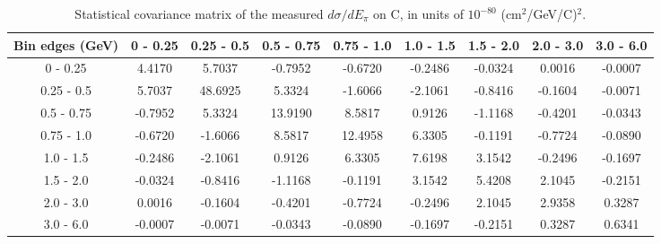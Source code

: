 \documentclass[aps,prl,twocolumn,superscriptaddress,nofootinbib]{revtex4-1}
\begin{document}
\begin{table}[h!]
  \centering
  \caption{Statistical covariance matrix of the measured $d\sigma/dE_{\pi}$ on C, in units of $10^{-80}$ (cm$^{2}$/GeV/C)$^{2}$.}
    \begin{tabular}{c||cccccccc}
      Bin edges (GeV) & 0 - 0.25 & 0.25 - 0.5 & 0.5 - 0.75 & 0.75 - 1.0 & 1.0 - 1.5 & 1.5 - 2.0 & 2.0 - 3.0 & 3.0 - 6.0 \\
\hline \hline
        0 - 0.25 &  4.4170 &  5.7037 & -0.7952 & -0.6720 & -0.2486 & -0.0324 &  0.0016 & -0.0007 \\
      0.25 - 0.5 &  5.7037 & 48.6925 &  5.3324 & -1.6066 & -2.1061 & -0.8416 & -0.1604 & -0.0071 \\
      0.5 - 0.75 & -0.7952 &  5.3324 & 13.9190 &  8.5817 &  0.9126 & -1.1168 & -0.4201 & -0.0343 \\
      0.75 - 1.0 & -0.6720 & -1.6066 &  8.5817 & 12.4958 &  6.3305 & -0.1191 & -0.7724 & -0.0890 \\
       1.0 - 1.5 & -0.2486 & -2.1061 &  0.9126 &  6.3305 &  7.6198 &  3.1542 & -0.2496 & -0.1697 \\
       1.5 - 2.0 & -0.0324 & -0.8416 & -1.1168 & -0.1191 &  3.1542 &  5.4208 &  2.1045 & -0.2151 \\
       2.0 - 3.0 &  0.0016 & -0.1604 & -0.4201 & -0.7724 & -0.2496 &  2.1045 &  2.9358 &  0.3287 \\
       3.0 - 6.0 & -0.0007 & -0.0071 & -0.0343 & -0.0890 & -0.1697 & -0.2151 &  0.3287 &  0.6341 \\
    \end{tabular}
  \label{tablecov:C_Statistical_Epi}
\end{table}
\end{document}
